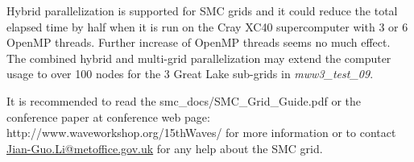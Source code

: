 Hybrid parallelization is supported for SMC grids and it could reduce the total
elapsed time by half when it is run on the Cray XC40 supercomputer with 3 or 6
OpenMP threads. Further increase of OpenMP threads seems no much effect.  The 
combined hybrid and multi-grid parallelization may extend the computer usage
to over 100 nodes for the 3 Great Lake sub-grids in \emph{mww3\_test\_09}.

It is recommended to read the smc\_docs/SMC\_Grid\_Guide.pdf or the
conference paper \citep{tol:LiS17} at conference web page: 
http://www.waveworkshop.org/15thWaves/
for more information or to contact \url{Jian-Guo.Li@metoffice.gov.uk} 
for any help about the SMC grid.

